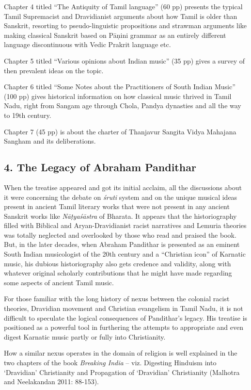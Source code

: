 Chapter 4 titled “The Antiquity of Tamil language” (60 pp) presents the typical Tamil Supremacist and Dravidianist arguments about how Tamil is older than Sanskrit, resorting to pseudo-linguistic propositions and strawman arguments like making classical Sanskrit based on Pāṇini grammar as an entirely different language discontinuous with Vedic Prakrit language etc.

Chapter 5 titled “Various opinions about Indian music” (35 pp) gives a survey of then prevalent ideas on the topic.

Chapter 6 titled “Some Notes about the Practitioners of South Indian Music” (100 pp) gives historical information on how classical music thrived in Tamil Nadu, right from Sangam age through Chola, Pandya dynasties and all the way to 19th century.

Chapter 7 (45 pp) is about the charter of Thanjavur Sangita Vidya Mahajana Sangham and its deliberations.


\subsection*{4. The Legacy of Abraham Pandithar}

When the treatise appeared and got its initial acclaim, all the discussions about it were concerning the debate on \textit{śruti }system and on the unique musical ideas present in ancient Tamil literary works that were not present in any ancient Sanskrit works like \textit{Nāṭyaśāstra} of Bharata. It appears that the historiography filled with Biblical and Aryan-Dravidianist racist narratives and Lemuria theories was totally neglected and overlooked by those who read and praised the book. But, in the later decades, when Abraham Pandithar is presented as an eminent South Indian musicologist of the 20th century and a “Christian icon” of Karnatic music, his dubious historiography also gets credence and validity, along with whatever original scholarly contributions that he might have made regarding some aspects of ancient Tamil music.

For those familiar with the long history of nexus between the colonial racist theories, Dravidian movement and Christian evangelism in Tamil Nadu, it is not difficult to speculate the logical consequences of Pandithar’s legacy. His treatise is positioned as a powerful tool in furthering the attempts to appropriate and even digest Karnatic music partly or fully into Christianity.

How a similar nexus operates in the domain of religion is well explained in the two chapters of the book \textit{Breaking India} – viz. Digesting Hinduism into ‘Dravidian’ Christianity and Propagation of ‘Dravidian’ Christianity (Malhotra and Neelakandan 2011: 88-153).

